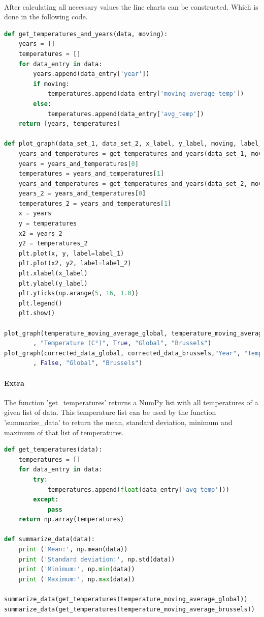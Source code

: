 \documentclass{article}
\begin{document}
\paragraph{}
After calculating all necessary values the line charts can be constructed. Which is done in the following code.
\begin{lstlisting}[language=Python]
def get_temperatures_and_years(data, moving):
	years = []
	temperatures = []
	for data_entry in data:
		years.append(data_entry['year'])
		if moving:
			temperatures.append(data_entry['moving_average_temp'])
		else:
			temperatures.append(data_entry['avg_temp'])
	return [years, temperatures]

def plot_graph(data_set_1, data_set_2, x_label, y_label, moving, label_1, label_2):
	years_and_temperatures = get_temperatures_and_years(data_set_1, moving)
	years = years_and_temperatures[0]
	temperatures = years_and_temperatures[1]
	years_and_temperatures = get_temperatures_and_years(data_set_2, moving)
	years_2 = years_and_temperatures[0]
	temperatures_2 = years_and_temperatures[1]
	x = years
	y = temperatures
	x2 = years_2
	y2 = temperatures_2
	plt.plot(x, y, label=label_1)
	plt.plot(x2, y2, label=label_2)
	plt.xlabel(x_label)
	plt.ylabel(y_label)
	plt.yticks(np.arange(5, 16, 1.0))
	plt.legend()
	plt.show()

plot_graph(temperature_moving_average_global, temperature_moving_average_brussels,"Year"
		, "Temperature (C°)", True, "Global", "Brussels")
plot_graph(corrected_data_global, corrected_data_brussels,"Year", "Temperature (C°)"
		, False, "Global", "Brussels")
\end{lstlisting}

\paragraph{Extra}
The function 'get\_temperatures' returns a NumPy list with all temperatures of a given list of data. This temperature list can be used by the function 'summarize\_data' to return the mean, standard deviation, minimum and maximum of that list of temperatures.
\begin{lstlisting}[language=Python]
def get_temperatures(data):
	temperatures = []
	for data_entry in data:
		try:
			temperatures.append(float(data_entry['avg_temp']))
		except:
			pass
	return np.array(temperatures)

def summarize_data(data):
	print ('Mean:', np.mean(data))
	print ('Standard deviation:', np.std(data))
	print ('Minimum:', np.min(data))
	print ('Maximum:', np.max(data))

summarize_data(get_temperatures(temperature_moving_average_global))
summarize_data(get_temperatures(temperature_moving_average_brussels))
\end{lstlisting}
\end{document}
